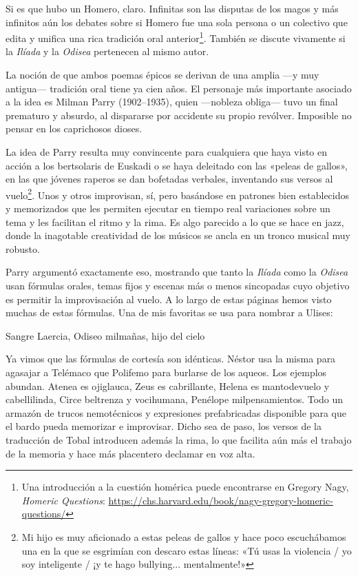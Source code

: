 \label{cap:homero}

Si es que hubo un Homero, claro. Infinitas son las disputas de los magos y más infinitos aún los debates sobre si Homero fue una sola persona o un colectivo que edita y unifica una rica tradición oral anterior\footnote{Una introducción a la cuestión homérica puede encontrarse en Gregory Nagy, \emph{Homeric Questions}: \url{https://chs.harvard.edu/book/nagy-gregory-homeric-questions/}}. También se discute vivamente si la \emph{Ilíada} y la \emph{Odisea} pertenecen al mismo autor.

La noción de que ambos poemas épicos se derivan de una amplia ---y muy antigua--- tradición oral tiene ya cien años. El personaje más importante asociado a la idea es Milman Parry (1902--1935), quien ---nobleza obliga--- tuvo un final prematuro y absurdo, al dispararse por accidente su propio revólver. Imposible no pensar en los caprichosos dioses.

La idea de Parry resulta muy convincente para cualquiera que haya visto en acción a los bertsolaris de Euskadi o se haya deleitado con las «peleas de gallos», en las que jóvenes raperos se dan bofetadas verbales, inventando sus versos al vuelo\footnote{Mi hijo es muy aficionado a estas peleas de gallos y hace poco escuchábamos una en la que se esgrimían con descaro estas líneas: «Tú usas la violencia / yo soy inteligente / ¡y te hago bullying... mentalmente!»}. Unos y otros improvisan, sí, pero basándose en patrones bien establecidos y memorizados que les permiten ejecutar en tiempo real variaciones sobre un tema y les facilitan el ritmo y la rima. Es algo parecido a lo que se hace en jazz, donde la inagotable creatividad de los músicos se ancla en un tronco musical muy robusto.

Parry argumentó exactamente eso, mostrando que tanto la \emph{Ilíada} como la \emph{Odisea} usan fórmulas orales, temas fijos y escenas más o menos sincopadas cuyo objetivo es permitir la improvisación al vuelo. A lo largo de estas páginas hemos visto muchas de estas fórmulas. Una de mis favoritas se usa para nombrar a Ulises:

\begin{versocita}
Sangre Laercia, Odiseo milmañas, hijo del cielo
\end{versocita}

Ya vimos que las fórmulas de cortesía son idénticas. Néstor usa la misma para agasajar a Telémaco que Polifemo para burlarse de los aqueos. Los ejemplos abundan. Atenea es ojiglauca, Zeus es cabrillante, Helena es mantodevuelo y cabellilinda, Circe beltrenza y vocihumana, Penélope milpensamientos. Todo un armazón de trucos nemotécnicos y expresiones prefabricadas disponible para que el bardo pueda memorizar e improvisar. Dicho sea de paso, los versos de la traducción de Tobal introducen además la rima, lo que facilita aún más el trabajo de la memoria y hace más placentero declamar en voz alta.

